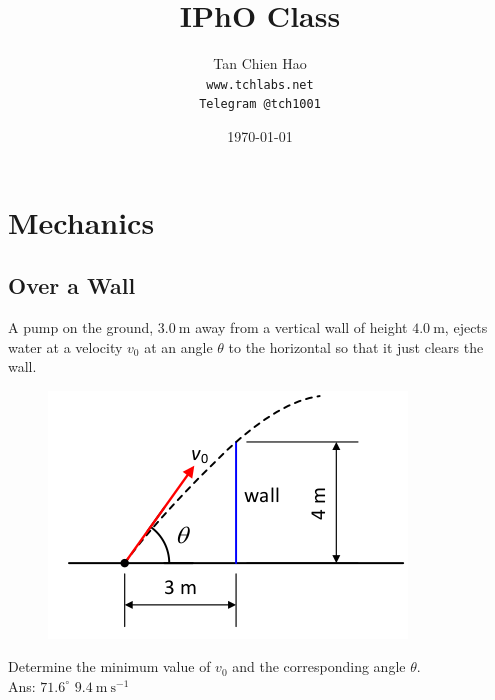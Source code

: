 \documentclass{article}
\title{IPhO Class}
\author{
    Tan Chien Hao\\
    \texttt{www.tchlabs.net}\\
    \texttt{Telegram @tch1001}
}
\date{\today}
\begin{document}
\newif\ifpaper

\paperfalse 

\maketitle
\tableofcontents
\clearpage 
\section{Mechanics}
\subsection{Over a Wall}
A pump on the ground, $3.0 \mathrm{~m}$ away from a vertical wall of height $4.0 \mathrm{~m}$, ejects water at a velocity $v_0$ at an angle $\theta$ to the horizontal so that it just clears the wall.
\begin{figure}[h]
    \centering
\includegraphics[width=0.5\linewidth]{images/overthewall.png}
\end{figure}
\noindent Determine the minimum value of $v_0$ and the corresponding angle $\theta$. \\[10pt]
Ans: $71.6^\circ$ $9.4 \mathrm{~m} \mathrm{~s}^{-1}$ 
\end{document}
